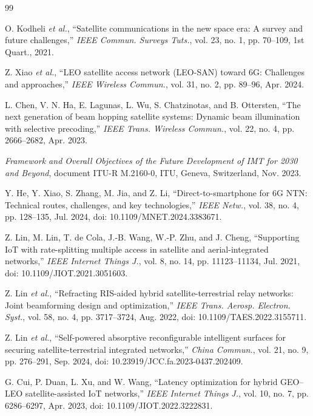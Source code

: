 \documentclass[journal]{IEEEtran}
\newcommand{\revbegin}[1]{\color{revisionblue}\ignorespaces}
\newcommand{\revend}[1]{\color{black}\ignorespaces}
\begin{document}
\begin{thebibliography}{99}


 O. Kodheli \textit{et al.}, ``Satellite communications in the new space era: A survey and future challenges,'' \textit{IEEE Commun. Surveys Tuts.}, vol. 23, no. 1, pp. 70--109, 1st Quart., 2021.

 Z. Xiao \textit{et al.}, ``LEO satellite access network (LEO-SAN) toward 6G: Challenges and approaches,'' \textit{IEEE Wireless Commun.}, vol. 31, no. 2, pp. 89--96, Apr. 2024.

 L. Chen, V. N. Ha, E. Lagunas, L. Wu, S. Chatzinotas, and B. Ottersten, ``The next generation of beam hopping satellite systems: Dynamic beam illumination with selective precoding,'' \textit{IEEE Trans. Wireless Commun.}, vol. 22, no. 4, pp. 2666--2682, Apr. 2023.

 \textit{Framework and Overall Objectives of the Future Development of IMT for 2030 and Beyond}, document ITU-R M.2160-0, ITU, Geneva, Switzerland, Nov. 2023.

\revbegin{} Y. He, Y. Xiao, S. Zhang, M. Jia, and Z. Li, ``Direct-to-smartphone for 6G NTN: Technical routes, challenges, and key technologies,'' \textit{IEEE Netw.}, vol. 38, no. 4, pp. 128--135, Jul. 2024, doi: 10.1109/MNET.2024.3383671.\revend{}

\revbegin{} Z. Lin, M. Lin, T. de Cola, J.-B. Wang, W.-P. Zhu, and J. Cheng, ``Supporting IoT with rate-splitting multiple access in satellite and aerial-integrated networks,'' \textit{IEEE Internet Things J.}, vol. 8, no. 14, pp. 11123--11134, Jul. 2021, doi: 10.1109/JIOT.2021.3051603.\revend{}

\revbegin{} Z. Lin \textit{et al.}, ``Refracting RIS-aided hybrid satellite-terrestrial relay networks: Joint beamforming design and optimization,'' \textit{IEEE Trans. Aerosp. Electron. Syst.}, vol. 58, no. 4, pp. 3717--3724, Aug. 2022, doi: 10.1109/TAES.2022.3155711.\revend{}

\revbegin{} Z. Lin \textit{et al.}, ``Self-powered absorptive reconfigurable intelligent surfaces for securing satellite-terrestrial integrated networks,'' \textit{China Commun.}, vol. 21, no. 9, pp. 276--291, Sep. 2024, doi: 10.23919/JCC.fa.2023-0437.202409.\revend{}

\revbegin{} G. Cui, P. Duan, L. Xu, and W. Wang, ``Latency optimization for hybrid GEO--LEO satellite-assisted IoT networks,'' \textit{IEEE Internet Things J.}, vol. 10, no. 7, pp. 6286--6297, Apr. 2023, doi: 10.1109/JIOT.2022.3222831.\revend{}


\end{thebibliography}
\end{document}
